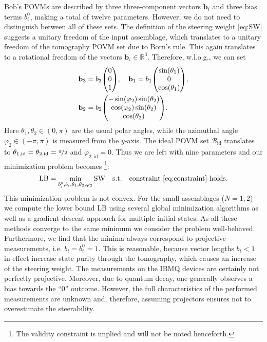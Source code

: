 \documentclass[aps,pra,twocolumn,superscriptaddress,showemail,showpacs,longbibliography]{revtex4-2}
\renewcommand{\vec}{\mathbf}
\newcommand{\Op}[1]{\ensuremath{\mathrm{#1}}}
\begin{document}
Bob's POVMs are described by three three-component vectors $\vec{b}_i$ and three bias terms $b^0_i$, making a total of twelve parameters. However, we do not need to distinguish between all of these sets. The definition of the steering weight \eqref{eq:SW} suggests a unitary freedom of the input assemblage, which translates to a unitary freedom of the tomography POVM set due to Born's rule. This again translates to a rotational freedom of the vectors ${\vec{b}_i} \in\mathbb{R}^3$. Therefore, w.l.o.g., we can set
\begin{equation}
\begin{split}
    \vec{b}_3 &= b_3 \mqty(0 \\ 0 \\ 1) \qc \vec{b}_1 = b_1 \mqty(\sin(\theta_1) \\ 0 \\ \cos(\theta_1)), \\
    \vec{b}_2 &= b_2 \mqty(-\sin(\varphi_2) \sin(\theta_2) \\ \cos(\varphi_2) \sin(\theta_2) \\ \cos(\theta_2)).
\end{split}
\end{equation}
Here $\theta_1, \theta_2 \in (0, \pi)$ are the usual polar angles, while the azimuthal angle $\varphi_2 \in (-\pi, \pi)$ is measured from the $y$-axis. The ideal POVM set $\mathcal{B}_\text{id}$ translates to $\theta_{1, \text{id}} = \theta_{2, \text{id}} = \nicefrac{\pi}{2}$ and $\varphi_{2, \text{id}} = 0$. Thus we are left with nine parameters and our minimization problem becomes \footnote{The validity constraint is implied and will not be noted henceforth.}:
\begin{equation}
    \Op{LB}= \min_{b^0_i, b_i, \theta_1, \theta_2, \varphi_2} \Op{SW} \quad \text{s.t.} \quad \text{constraint \eqref{eq:constraint} holds}.
\end{equation}
This minimization problem is not convex. For the small assemblages ($N=1,2$) we compute the lower bound $\Op{LB}$ using several global minimization algorithms as well as a gradient descent approach for multiple initial states. As all these methods converge to the same minimum we consider the problem well-behaved. 
Furthermore, we find that the minima always correspond to projective measurements, i.e. $b_i=b^0_i=1$. 
This is reasonable, because vector lengths $b_i < 1$ in effect increase state purity through the tomography, which causes an increase of the steering weight.
The measurements on the IBMQ devices are certainly not perfectly projective. Moreover, due to quantum decay, one generally observes a bias towards the ``0'' outcome. However, the full characteristics of the performed measurements are unknown and, therefore, assuming projectors ensures not to overestimate the steerability.
\end{document}
